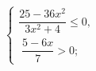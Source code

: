 \begin{ex}[type=ineq_system]
	\begin{condition}
		$\begin{cases}\dfrac{25 -36x^2 }{3x^2 + 4}\leqslant0  ,\\
			\; \dfrac{5 - 6x}{7}>0  ;
		\end{cases}$
	\end{condition}
	\answer{$ \left(-\infty;-\dfrac{5}{6}\right]  ; $}
\end{ex}